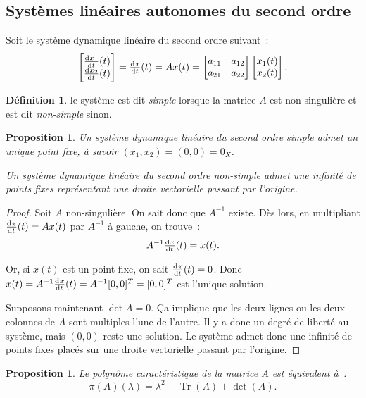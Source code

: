 \documentclass{article}
\newtheorem{prp}[thm]{Proposition}
\theoremstyle{definition}
\newtheorem{déf}[thm]{Définition}
\theoremstyle{remark}
\DeclareMathOperator{\Tr}{Tr}
\begin{document}
	\subsection{Systèmes linéaires autonomes du second ordre}

	Soit le système dynamique linéaire du second ordre suivant~:
	\[\begin{bmatrix}\od {x_1}t(t) \\\od {x_2}t(t)\end{bmatrix} = \od xt(t) = Ax(t)
		= \begin{bmatrix}a_{11} & a_{12} \\a_{21} & a_{22}\end{bmatrix}\begin{bmatrix}x_1(t) \\ x_2(t)\end{bmatrix}.\]

	\begin{déf} le système est dit \textit{simple} lorsque la matrice $A$ est non-singulière et est dit \textit{non-simple} sinon.
	\end{déf}

	\begin{prp} Un système dynamique linéaire du second ordre simple admet un unique point fixe, à savoir $(x_1, x_2) = (0, 0) = 0_X$.

	Un système dynamique linéaire du second ordre non-simple admet une infinité de points fixes représentant une droite vectorielle passant par l'origine.
	\end{prp}

	\begin{proof} Soit $A$ non-singulière. On sait donc que $A^{-1}$ existe. Dès lors, en multipliant $\od xt(t) = Ax(t)$ par $A^{-1}$ à gauche, on trouve~:
	\[A^{-1}\od xt(t) = x(t).\]

	Or, si $x(t)$ est un point fixe, on sait $\od xt(t) = 0$. Donc $x(t) = A^{-1}\od xt(t) = A^{-1}[0, 0]^T = [0, 0]^T$ est l'unique solution.

	Supposons maintenant $\det A = 0$. Ça implique que les deux lignes ou les deux colonnes de $A$ sont multiples l'une de l'autre. Il y a donc un degré de
	liberté au système, mais $(0, 0)$ reste une solution. Le système admet donc une infinité de points fixes placés sur une droite vectorielle passant par
	l'origine.
	\end{proof}

	\begin{prp} Le polynôme caractéristique de la matrice $A$ est équivalent à~:
	\[\pi(A)(\lambda) = \lambda^2 - \Tr(A) + \det(A).\]
	\end{prp}
\end{document}
